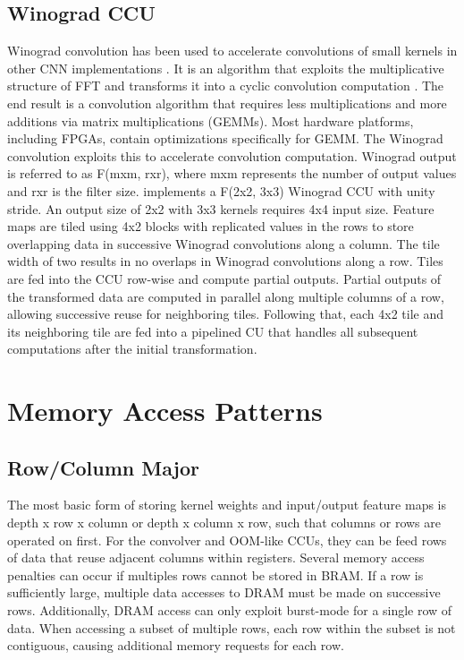 \subsection{Winograd CCU}
Winograd convolution \cite{winograd1980arithmetic} has been used to accelerate convolutions of small kernels in other CNN implementations \cite{dicecco2016caffeinated, lavin2016fast, lu2017evaluating}. It is an algorithm that exploits the multiplicative structure of FFT and transforms it into a cyclic convolution computation \cite{winograd1976computing}. The end result is a convolution algorithm that requires less multiplications and more additions via matrix multiplications (GEMMs). Most hardware platforms, including FPGAs, contain optimizations specifically for GEMM. The Winograd convolution exploits this to accelerate convolution computation. Winograd output is referred to as F(mxm, rxr), where mxm represents the number of output values and rxr is the filter size. \cite{dicecco2016caffeinated} implements a F(2x2, 3x3) Winograd CCU with unity stride. An output size of 2x2 with 3x3 kernels requires 4x4 input size. Feature maps are tiled using 4x2 blocks with replicated values in the rows to store overlapping data in successive Winograd convolutions along a column. The tile width of two results in no overlaps in Winograd convolutions along a row. Tiles are fed into the CCU row-wise and compute partial outputs. Partial outputs of the transformed data are computed in parallel along multiple columns of a row, allowing successive reuse for neighboring tiles. Following that, each 4x2 tile and its neighboring tile are fed into a pipelined CU that handles all subsequent computations after the initial transformation.

\section{Memory Access Patterns}
\subsection{Row/Column Major}
The most basic form of storing kernel weights and input/output feature maps is depth x row x column or depth x column x row, such that columns or rows are operated on first. For the convolver and OOM-like CCUs, they can be feed rows of data that reuse adjacent columns within registers. Several memory access penalties can occur if multiples rows cannot be stored in BRAM. If a row is sufficiently large, multiple data accesses to DRAM must be made on successive rows. Additionally, DRAM access can only exploit burst-mode for a single row of data. When accessing a subset of multiple rows, each row within the subset is not contiguous, causing additional memory requests for each row.

